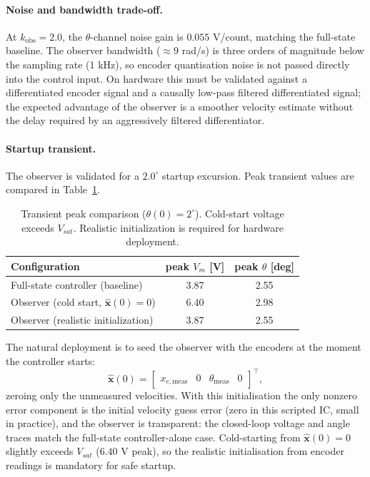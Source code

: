 \documentclass[11pt,a4paper]{article}
\begin{document}
\paragraph{Noise and bandwidth trade-off.}
At $k_{\mathrm{obs}} = 2.0$, the $\theta$-channel noise gain is $0.055$ V/count, matching the full-state baseline. The observer bandwidth ($\approx 9$ rad/s) is three orders of magnitude below the sampling rate (1 kHz), so encoder quantisation noise is not passed directly into the control input. On hardware this must be validated against a differentiated encoder signal and a causally low-pass filtered differentiated signal; the expected advantage of the observer is a smoother velocity estimate without the delay required by an aggressively filtered differentiator.

\paragraph{Startup transient.}
The observer is validated for a $2.0^\circ$ startup excursion. Peak transient values are compared in Table~\ref{table:obs_startup}.

\begin{table}[H]
	\centering
	\begin{tabular}{lcc}
		\hline
		\rowcolor{bluePoli!40}
		Configuration & peak $V_m$ [V] & peak $\theta$ [deg] \T\B \\
		\hline\hline
		Full-state controller (baseline) & 3.87 & 2.55 \T\\
		Observer (cold start, $\hat{\mathbf{x}}(0)=0$) & 6.40 & 2.98 \\
		Observer (realistic initialization) & 3.87 & 2.55 \B\\
		\hline
	\end{tabular}
	\caption{Transient peak comparison ($\theta(0)=2^\circ$). Cold-start voltage exceeds $V_{sat}$. Realistic initialization is required for hardware deployment.}
	\label{table:obs_startup}
\end{table}

The natural deployment is to seed the observer with the encoders at the moment the controller starts:
\begin{equation}
	\hat{\mathbf{x}}(0) = \begin{bmatrix} x_{c,\mathrm{meas}} & 0 & \theta_{\mathrm{meas}} & 0 \end{bmatrix}^\top,
	\label{eq:obs_init}
\end{equation}
zeroing only the unmeasured velocities. With this initialisation the only nonzero error component is the initial velocity guess error (zero in this scripted IC, small in practice), and the observer is transparent: the closed-loop voltage and angle traces match the full-state controller-alone case. Cold-starting from $\hat{\mathbf{x}}(0)=0$ slightly exceeds $V_{sat}$ ($6.40$ V peak), so the realistic initialisation from encoder readings is mandatory for safe startup.
\end{document}
